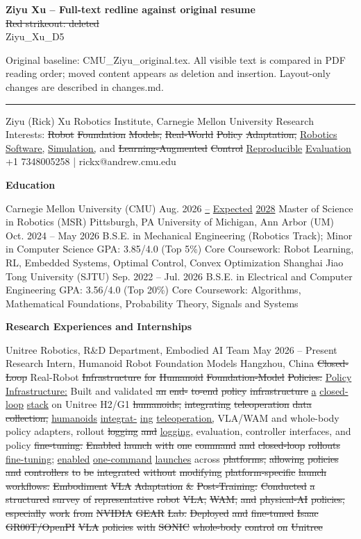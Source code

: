 \documentclass[10pt,letterpaper]{article}
\newcommand{\del}[1]{{\color{red}\sout{#1}}}
\newcommand{\add}[1]{{\color{blue}\uline{#1}}}
\begin{document}
\textbf{Ziyu Xu -- Full-text redline against original resume}\\
\del{Red strikeout: deleted} \quad \add{Blue underline: added}\\
Ziyu\_Xu\_D5\par
Original baseline: CMU\_Ziyu\_original.tex. All visible text is compared in PDF reading order; moved content appears as deletion and insertion. Layout-only changes are described in changes.md.
\hrule\medskip
Ziyu (Rick) Xu Robotics Institute, Carnegie Mellon University Research Interests: \del{Robot} \del{Foundation} \del{Models,} \del{Real-World} \del{Policy} \del{Adaptation,} \add{Robotics} \add{Software,} \add{Simulation,} and \del{Learning-Augmented} \del{Control} \add{Reproducible} \add{Evaluation} +1 7348005258 | rickx@andrew.cmu.edu \par\medskip\textbf{Education}\par  Carnegie Mellon University (CMU) Aug. 2026 \add{--} \add{Expected} \add{2028} Master of Science in Robotics (MSR) Pittsburgh, PA University of Michigan, Ann Arbor (UM) Oct. 2024 -- May 2026 B.S.E. in Mechanical Engineering (Robotics Track); Minor in Computer Science GPA: 3.85/4.0 (Top 5\%)  Core Coursework: Robot Learning, RL, Embedded Systems, Optimal Control, Convex Optimization Shanghai Jiao Tong University (SJTU) Sep. 2022 -- Jul. 2026 B.S.E. in Electrical and Computer Engineering GPA: 3.56/4.0 (Top 20\%)  Core Coursework: Algorithms, Mathematical Foundations, Probability Theory, Signals and Systems \par\medskip\textbf{Research Experiences and Internships}\par  Unitree Robotics, R\&D Department, Embodied AI Team May 2026 -- Present Research Intern, Humanoid Robot Foundation Models Hangzhou, China  \del{Closed-Loop} Real-Robot \del{Infrastructure} \del{for} \del{Humanoid} \del{Foundation-Model} \del{Policies:} \add{Policy} \add{Infrastructure:} Built and validated \del{an} \del{end-} \del{to-end} \del{policy} \del{infrastructure} \add{a} \add{closed-loop} \add{stack} on Unitree H2/G1 \del{humanoids,} \del{integrating} \del{teleoperation} \del{data} \del{collection,} \add{humanoids} \add{integrat-} \add{ing} \add{teleoperation,} VLA/WAM and whole-body policy adapters, rollout \del{logging} \del{and} \add{logging,} evaluation, controller interfaces, and policy \del{fine-tuning.} \del{Enabled} \del{launch} \del{with} \del{one} \del{command} \del{and} \del{closed-loop} \del{rollouts} \add{fine-tuning;} \add{enabled} \add{one-command} \add{launches} across \del{platforms,} \del{allowing} \del{policies} \del{and} \del{controllers} \del{to} \del{be} \del{integrated} \del{without} \del{modifying} \del{platform-specific} \del{launch} \del{workflows.} \del{} \del{Embodiment} \del{VLA} \del{Adaptation} \del{\&} \del{Post-Training:} \del{Conducted} \del{a} \del{structured} \del{survey} \del{of} \del{representative} \del{robot} \del{VLA,} \del{WAM,} \del{and} \del{physical-AI} \del{policies,} \del{especially} \del{work} \del{from} \del{NVIDIA} \del{GEAR} \del{Lab.} \del{Deployed} \del{and} \del{fine-tuned} \del{Isaac} \del{GR00T/OpenPI} \del{VLA} \del{policies} \del{with} \del{SONIC} \del{whole-body} \del{control} \del{on} \del{Unitree} 
\end{document}
